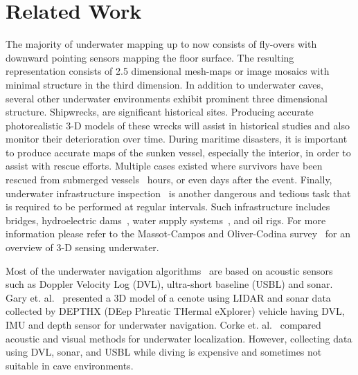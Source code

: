 \section{Related Work}\label{sec:pcrelwork}
The majority of underwater mapping up to now consists of fly\hyp overs with downward pointing sensors mapping the floor surface. The resulting representation consists of 2.5 dimensional mesh\hyp maps or image mosaics with minimal structure in the third dimension. In addition to underwater caves,  several other underwater environments  exhibit prominent three dimensional structure. Shipwrecks, are significant historical sites.  Producing accurate photorealistic 3\hyp D  models of these wrecks will assist in historical studies and also monitor their deterioration over time. During maritime disasters, it is important to produce accurate maps of the sunken vessel, especially the interior, in order to assist with rescue efforts. Multiple cases existed where survivors have been rescued from submerged vessels~\cite{Gray2003} hours, or even days after the event. Finally, underwater infrastructure inspection~\cite{Ribas2008} is another dangerous and tedious task that is required to be performed at regular intervals. Such infrastructure includes bridges, hydroelectric dams~\cite{Ridao2010}, water supply systems~\cite{White2010}, and oil rigs. For more information please refer to the Massot\hyp Campos and Oliver\hyp Codina survey~\cite{massot2015optical} for an overview of 3\hyp D sensing underwater. 

Most of the underwater navigation algorithms~\cite{lee2005underwater,snyder2010doppler,johannsson2010imaging,rigby2006towards} are based on acoustic sensors such as Doppler Velocity Log (DVL), ultra-short baseline (USBL) and sonar.  Gary et. al.~\cite{gary20083d} presented a 3D model of a cenote using LIDAR and sonar data collected by DEPTHX (DEep Phreatic THermal eXplorer) vehicle having DVL, IMU and depth sensor for underwater navigation. Corke et. al.~\cite{corke2007experiments} compared acoustic and visual methods for underwater localization. However, collecting data using DVL, sonar, and USBL while diving is expensive and sometimes not suitable in cave environments. 

